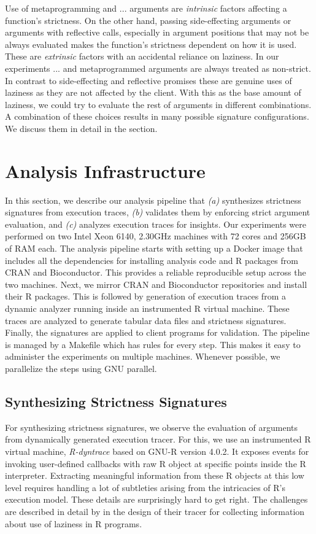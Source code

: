 \documentclass[review,nonacm,screen,acmsmall,anonymous=true]{acmart}
\begin{document}
Use of metaprogramming and $...$ arguments are \emph{intrinsic} factors
affecting a function's strictness. On the other hand, passing side-effecting
arguments or arguments with reflective calls, especially in argument positions
that may not be always evaluated makes the function's strictness dependent on
how it is used. These are \emph{extrinsic} factors with an accidental reliance
on laziness. In our experiments $...$ and metaprogrammed arguments are always
treated as non-strict. In contrast to side-effecting and reflective promises
these are genuine uses of laziness as they are not affected by the client. With
this as the base amount of laziness, we could try to evaluate the rest of
arguments in different combinations. A combination of these choices results in
many possible signature configurations. We discuss them in detail in the
 section.

\section{Analysis Infrastructure}
In this section, we describe our analysis pipeline that \emph{(a)} synthesizes
strictness signatures from execution traces, \emph{(b)} validates them by
enforcing strict argument evaluation, and \emph{(c)} analyzes execution traces
for insights. Our experiments were performed on two Intel Xeon 6140, 2.30GHz
machines with 72 cores and 256GB of RAM each. The analysis pipeline starts with
setting up a Docker image that includes all the dependencies for installing
analysis code and R packages from CRAN and Bioconductor. This provides a
reliable reproducible setup across the two machines. Next, we mirror CRAN and
Bioconductor\cite{bioc} repositories and install their R packages. This is
followed by generation of execution traces from a dynamic analyzer running
inside an instrumented R virtual machine. These traces are analyzed to generate
tabular data files and strictness signatures. Finally, the signatures are
applied to client programs for validation. The pipeline is managed by a Makefile
which has rules for every step. This makes it easy to administer the experiments
on multiple machines. Whenever possible, we parallelize the steps using GNU
parallel\cite{tange2011a}.

\subsection{Synthesizing Strictness Signatures}

For synthesizing strictness signatures, we observe the evaluation of arguments
from dynamically generated execution tracer. For this, we use an instrumented R
virtual machine, \emph{R-dyntrace} \citet{oopsla19b} based on GNU-R version
4.0.2. It exposes events for invoking user-defined callbacks with raw R object
at specific points inside the R interpreter. Extracting meaningful information
from these R objects at this low level requires handling a lot of subtleties
arising from the intricacies of R's execution model. These details are
surprisingly hard to get right. The challenges are described in detail by
\cite{oopsla19b} in the design of their tracer for collecting information about
use of laziness in R programs.
\end{document}
